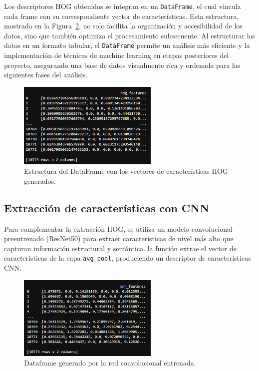 Los descriptores HOG obtenidos se integran en un \texttt{DataFrame}, el cual vincula cada frame con su correspondiente vector de características. Esta estructura, mostrada en la Figura~\ref{fig:convolucion}, no solo facilita la organización y accesibilidad de los datos, sino que también optimiza el procesamiento subsecuente. Al estructurar los datos en un formato tabular, el \texttt{DataFrame} permite un análisis más eficiente y la implementación de técnicas de machine learning en etapas posteriores del proyecto, asegurando una base de datos visualmente rica y ordenada para las siguientes fases del análisis.

\begin{figure}[H]
    \centering
    \includegraphics[width=0.60\textwidth]{4/figures/Caracteristicas_1.png}
    \caption{Estructura del DataFrame con los vectores de características HOG generados.}
    \label{fig:convolucion}
\end{figure}


\subsection{Extracción de características con CNN}
Para complementar la extracción HOG, se utiliza un modelo convolucional preentrenado (ResNet50) para extraer características de nivel más alto que capturan información estructural y semántica. la función extrae el vector de características de la capa \texttt{avg\_pool}, produciendo un descriptor de características CNN.

\begin{figure}[H]
    \centering
    \includegraphics[width=0.60\textwidth]{4/figures/Caracteristicas_2.png}
    \caption{Dataframe generado por la red convolucional entrenada.}
    \label{fig:convolucion}
\end{figure}


